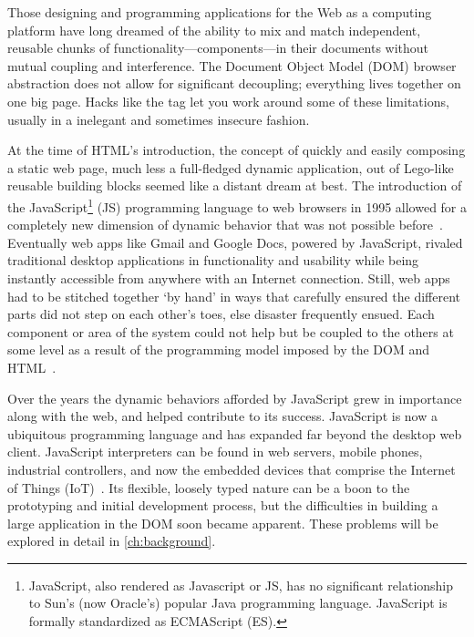 Those designing and programming applications for the Web as a computing platform have long dreamed of the ability to mix and match independent, reusable chunks of functionality---components---in their documents without mutual coupling and interference. 
The Document Object Model (DOM)
browser abstraction does not allow for significant decoupling; 
everything lives together on one big page. Hacks like the 
tag let you work around some of these limitations, usually in a inelegant and sometimes insecure fashion.

At the time of HTML's introduction, the concept of quickly and easily composing a static web page, 
much less a full-fledged dynamic application, 
out of Lego-like reusable building blocks seemed like a distant dream at best. 
The introduction of the 
JavaScript\footnote{JavaScript, also rendered as Javascript or JS, 
has no significant relationship to Sun's (now Oracle's) popular Java programming language. JavaScript is formally standardized as ECMAScript (ES).}
(JS) programming language to web browsers in 1995 allowed for a completely new dimension of dynamic behavior that was not possible before~\cite{w3ccontributors2012}.
Eventually web apps like Gmail and Google Docs, powered by JavaScript, rivaled traditional desktop applications in functionality and usability while being instantly accessible from anywhere with an Internet connection.
Still, web apps had to be stitched together `by hand' in ways that carefully ensured the different parts did not step on each other's toes, else disaster frequently ensued. 
Each component or area of the system could not help but be coupled to the others at some level as a result of the programming model imposed by the DOM and HTML~\cite{ihrig2012}.

Over the years the dynamic behaviors afforded by JavaScript grew in importance along with the web, and helped contribute to its success. 
JavaScript is now a ubiquitous programming language and has expanded far beyond the desktop web client. 
JavaScript interpreters can be found in web servers, mobile phones, industrial controllers, and now the embedded devices that comprise the Internet of Things (IoT)~\cite{flaki2015}.
Its flexible, loosely typed nature can be a boon to the prototyping and initial development process,
but the difficulties in building a large application in the DOM soon became apparent.
These problems will be explored in detail in \cref{ch:background}.

